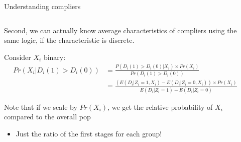 \documentclass[notes,11pt, aspectratio=169]{beamer}
\newenvironment{wideitemize}{\itemize\addtolength{\itemsep}{10pt}}{\enditemize}
\begin{document}
\begin{frame}{Understanding compliers}
  \begin{columns}[T] %
    \begin{column}{0.7\textwidth}
      \begin{wideitemize}
      \item Second, we can actually know average characteristics of
        compliers using the same logic, if the characteristic is
        discrete.
      \item Consider $X_{i}$ binary:
        \begin{align*}
          Pr(X_{i} | D_{i}(1) > D_{i}(0)) &= \frac{P(D_{i}(1) > D_{i}(0) | X_{i}) \times Pr(X_{i})}{Pr(D_{i}(1) > D_{i}(0))}\\
          &= \frac{\left(E(D_{i} | Z_{i} = 1, X_{i}) - E(D_{i} | Z_{i} = 0, X_{i})\right) \times Pr(X_{i})}{E(D_{i} | Z_{i} = 1) - E(D_{i} | Z_{i} = 0)}
        \end{align*}
      \item Note that if we scale by $Pr(X_{i})$, we get the relative
        probability of $X_{i}$ compared to the overall pop
        \begin{itemize}
        \item Just the ratio of the first stages for each group!
        \end{itemize}
      \end{wideitemize}
\end{column}
\begin{column}{0.3\textwidth}
\end{column}
\end{columns}

  
\end{frame}
\end{document}
